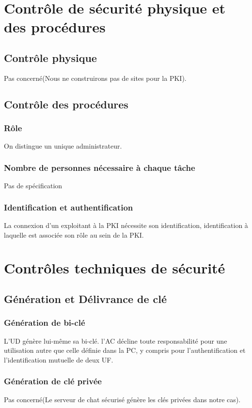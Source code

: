 \documentclass[a4paper,11pt,french]{article}
\begin{document}
\section{Contrôle de sécurité physique et des procédures}
\subsection{Contrôle physique}
Pas concerné(Nous ne construirons pas de sites pour la PKI).
\subsection{Contrôle des procédures}
\subsubsection{Rôle}
On distingue un unique administrateur.

\subsubsection{Nombre de personnes nécessaire à chaque tâche}
Pas de spécification

\subsubsection{Identification et authentification}
La connexion d'un exploitant à la PKI nécessite son identification, identification à laquelle est associée son rôle au sein de la PKI.

\section{Contrôles techniques de sécurité}

\subsection{Génération et Délivrance de clé}
\subsubsection{Génération de bi-clé}
L'UD génère lui-même sa bi-clé. l'AC décline toute responsabilité pour une utilisation autre que celle définie dans la PC, y
compris pour l'authentification et l'identification mutuelle de deux UF. 
\subsubsection{Génération de clé privée}
Pas concerné(Le serveur de chat sécurisé génère les clés privées dans notre cas).
\end{document}
